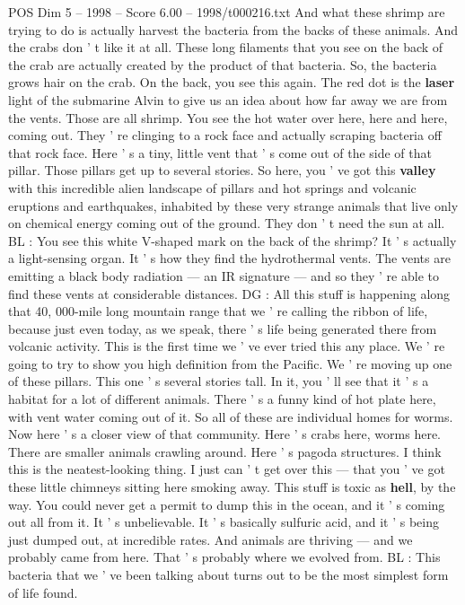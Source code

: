 \begin{textsample}{POS Dim 5 – 1998 – Score 6.00 – 1998/t000216.txt}
And what these shrimp are trying to do is actually harvest the bacteria from the backs of these animals.
And the crabs don ' t like it at all.
These long filaments that you see on the back of the crab are actually created by the product of that bacteria.
So, the bacteria grows hair on the crab.
On the back, you see this again.
The red dot is the \textbf{laser} light of the submarine Alvin to give us an idea about how far away we are from the vents.
Those are all shrimp.
You see the hot water over here, here and here, coming out.
They ' re clinging to a rock face and actually scraping bacteria off that rock face.
Here ' s a tiny, little vent that ' s come out of the side of that pillar.
Those pillars get up to several stories.
So here, you ' ve got this \textbf{valley} with this incredible alien landscape of pillars and hot springs and volcanic eruptions and earthquakes, inhabited by these very strange animals that live only on chemical energy coming out of the ground.
They don ' t need the sun at all.
BL : You see this white V-shaped mark on the back of the shrimp?
It ' s actually a light-sensing organ.
It ' s how they find the hydrothermal vents.
The vents are emitting a black body radiation — an IR signature — and so they ' re able to find these vents at considerable distances.
DG : All this stuff is happening along that 40, 000-mile long mountain range that we ' re calling the ribbon of life, because just even today, as we speak, there ' s life being generated there from volcanic activity.
This is the first time we ' ve ever tried this any place.
We ' re going to try to show you high definition from the Pacific.
We ' re moving up one of these pillars.
This one ' s several stories tall.
In it, you ' ll see that it ' s a habitat for a lot of different animals.
There ' s a funny kind of hot plate here, with vent water coming out of it.
So all of these are individual homes for worms.
Now here ' s a closer view of that community.
Here ' s crabs here, worms here.
There are smaller animals crawling around.
Here ' s pagoda structures.
I think this is the neatest-looking thing.
I just can ' t get over this — that you ' ve got these little chimneys sitting here smoking away.
This stuff is toxic as \textbf{hell}, by the way.
You could never get a permit to dump this in the ocean, and it ' s coming out all from it.
It ' s unbelievable.
It ' s basically sulfuric acid, and it ' s being just dumped out, at incredible rates.
And animals are thriving — and we probably came from here.
That ' s probably where we evolved from.
BL : This bacteria that we ' ve been talking about turns out to be the most simplest form of life found.

\end{textsample}
